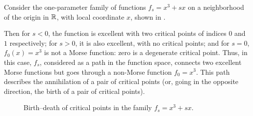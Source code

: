 \begin{example}\label{x:morse-x3}
  Consider the one-parameter family of functions $f_s= x^3+sx$ on a neighborhood
  of the origin in $\mathbb{R}$, with local coordinate $x$, shown in .

  Then for $s<0$, the function is excellent with two critical points of indices
  $0$ and $1$ respectively; for $s>0$, it is also excellent, with no critical
  points; and for $s=0$, $f_0(x)=x^3$ is not a Morse function: zero is a
  degenerate critical point. Thus, in this case, $f_s$, considered as a path in
  the function space, connects two excellent Morse functions but goes through a
  non-Morse function $f_0=x^3$. This path describes the annihilation of a pair
  of critical points (or, going in the opposite direction, the birth of a pair
  of critical points).

  \begin{figure}[ht]
    \centering
    \qquad
    \qquad
    \caption{Birth--death of critical points in the family $f_s=x^3+sx$.}
    \label{fig:x3}
  \end{figure}


\end{example}

